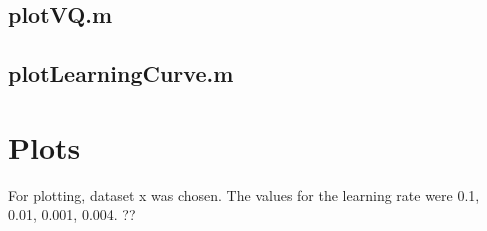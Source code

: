 \documentclass[10pt,a4paper]{article}
\begin{document}
\subsection{plotVQ.m}


\subsection{plotLearningCurve.m}


\section{Plots}
For plotting, dataset x was chosen. The values for the learning rate were 0.1, 0.01, 0.001, 0.004. ??

 \\
\end{document}

